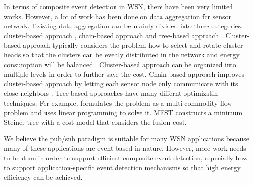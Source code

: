 In terms of composite event detection in WSN, there have been very limited works. However, a lot of work has been done on data aggregation for sensor network. Existing data aggregation can be mainly divided into three categories: cluster-based approach \cite{leach, iheed, epas}, chain-based approach \cite{pegasis} and tree-based approach \cite{mfst, dctc, tag, xue:lp, tina}. Cluster-based approach typically considers the problem how to select and rotate cluster heads so that the clusters can be evenly distributed in the network \cite{iheed} and energy consumption will be balanced \cite{leach}. Cluster-based approach can be organized into multiple levels in order to further save the cost. Chain-based approach improves cluster-based approach by letting each sensor node only communicate with its close neighbors \cite{pegasis}. Tree-based approaches have many differnt optimizatin techniques. For example, \cite{xue:lp} formulates the problem as a multi-commodity flow problem and uses linear programming to solve it.  MFST \cite{mfst} constructs a minimum Steiner tree with a cost model that considers the fusion cost. 

We believe the pub/sub paradigm is suitable for many WSN applications because many of these applications are event-based in nature. However, more work needs to be done in order to support efficient composite event detection, especially how to support application-specific event detection mechanisms so that high energy efficiency can be achieved.